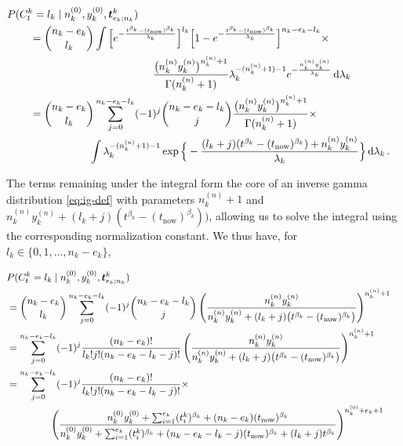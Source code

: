 \documentclass[Journal,SectionNumbers,SingleSpace,InsideFigs]{ascelike}
\newcommand{\dd}{\,\mathrm{d}}
\renewcommand{\vec}[1]{{\bm#1}}
\newcommand{\uz}{^{(0)}} %
\newcommand{\un}{^{(n)}} %
\def\ykz{y\uz_k}
\def\ykn{y\un_k}
\def\nkz{n\uz_k}
\def\nkn{n\un_k}
\def\tnow{t_\text{now}}
\begin{document}
\begin{linenomath*}
\begin{align}
\lefteqn{P(C^k_t = l_k\mid\nkz,\ykz, \vec{t}^k_{e_k;n_k})}\hspace*{5ex} \\
 &= { n_k - e_k \choose l_k} \int \Big[    e^{-\frac{t^{\beta_k} - (\tnow)^{\beta_k}}{\lambda_k}}\Big]^{l_k}
                                  \Big[1 - e^{-\frac{t^{\beta_k} - (\tnow)^{\beta_k}}{\lambda_k}}\Big]^{n_k - e_k - l_k}\times\\&\hspace*{27ex}
    \frac{\big(\nkn\ykn\big)^{\nkn + 1}}{\Gamma(\nkn+1)} \lambda_k^{-(\nkn + 1) - 1} e^{-\frac{\nkn\ykn}{\lambda_k}} \dd \lambda_k \\
 &= { n_k - e_k \choose l_k} \sum_{j=0}^{n_k-e_k-l_k} (-1)^j { n_k - e_k - l_k \choose j} \frac{\big(\nkn\ykn\big)^{\nkn + 1}}{\Gamma(\nkn+1)} 
    \times \\ & \hspace*{13ex}
    \int \lambda_k^{-(\nkn + 1) - 1} \exp\Big\{-\frac{(l_k + j) (t^{\beta_k} - (\tnow)^{\beta_k}) + \nkn\ykn}{\lambda_k}\Big\} \dd \lambda_k\,.
\end{align}
\end{linenomath*}
%
The terms remaining under the integral form the core of an inverse gamma distribution \eqref{eq:ig-def}
with parameters $\nkn + 1$ and $\nkn\ykn + (l_k + j) (t^{\beta_k} - (\tnow)^{\beta_k}))$,
allowing us to solve the integral using the corresponding normalization constant.
We thus have, for $l_k \in \{0,1,\ldots,n_k-e_k\}$,
\begin{linenomath*}
\begin{align}
\lefteqn{P(C^k_t = l_k\mid\nkz,\ykz, \vec{t}^k_{e_k;n_k})} \\
 &= { n_k - e_k \choose l_k} \sum_{j=0}^{n_k-e_k-l_k} (-1)^j { n_k - e_k - l_k \choose j}
    \left(\frac{\nkn\ykn}{\nkn\ykn + (l_k + j) \big(t^{\beta_k} - (\tnow)^{\beta_k}\big)}\right)^{\nkn + 1} \\
 &= \sum_{j=0}^{n_k-e_k-l_k} (-1)^j \frac{(n_k - e_k)!}{l_k! j! (n_k - e_k - l_k - j)!}   
    \left(\frac{\nkn\ykn}{\nkn\ykn + (l_k + j) \big(t^{\beta_k} - (\tnow)^{\beta_k}\big)}\right)^{\nkn + 1} \\
 &= \sum_{j=0}^{n_k-e_k-l_k} (-1)^j \frac{(n_k - e_k)!}{l_k! j! (n_k - e_k - l_k - j)!} \times \\ & \hspace*{10ex}  
    \left(\frac{\nkz\ykz + \sum_{i=1}^{e_k} (t_i^k)^{\beta_k} + (n_k-e_k)       (\tnow)^{\beta_k} }%
               {\nkz\ykz + \sum_{i=1}^{e_k} (t_i^k)^{\beta_k} + (n_k-e_k-l_k-j) (\tnow)^{\beta_k} + (l_k + j) t^{\beta_k} }\right)^{%
    \nkz + e_k + 1} 
\end{align}
\end{linenomath*}
\end{document}

